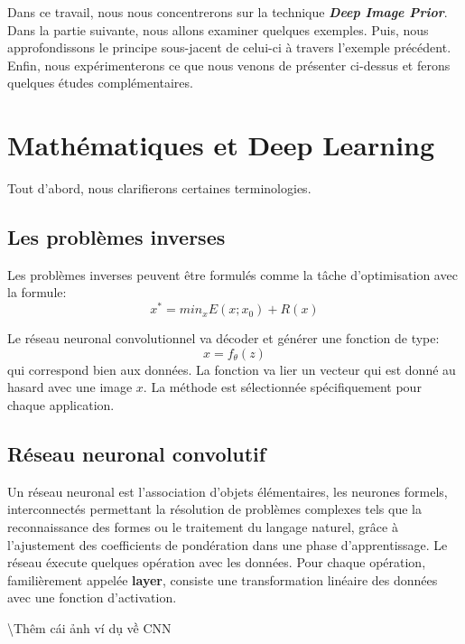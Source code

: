 \documentclass[
  11pt,
  dvipsnames]{article}
\begin{document}
Dans ce travail, nous nous concentrerons sur la technique \textbf{\emph{Deep Image Prior}}.
Dans la partie suivante, nous allons examiner quelques exemples.
Puis, nous approfondissons le principe sous-jacent de celui-ci à travers l'exemple précédent.
Enfin, nous expérimenterons ce que nous venons de présenter ci-dessus
et ferons quelques études complémentaires.

\newpage

\hypertarget{mathuxe9matiques-et-deep-learning}{%
\section{Mathématiques et Deep Learning}\label{mathuxe9matiques-et-deep-learning}}

Tout d'abord, nous clarifierons certaines terminologies.

\hypertarget{les-probluxe8mes-inverses}{%
\subsection{Les problèmes inverses}\label{les-probluxe8mes-inverses}}

Les problèmes inverses peuvent être formulés comme la tâche d'optimisation avec la formule:
\[x^* = min_{x}E(x;x_{0}) + R(x)\]

Le réseau neuronal convolutionnel va décoder et générer une fonction de type:
\[x = f_{\theta}(z)\]
qui correspond bien aux données. La fonction va lier un vecteur qui est donné au hasard avec une image \(x\).
La méthode est sélectionnée spécifiquement pour chaque application.

\hypertarget{ruxe9seau-neuronal-convolutif}{%
\subsection{Réseau neuronal convolutif}\label{ruxe9seau-neuronal-convolutif}}

Un réseau neuronal est l'association d'objets élémentaires, les neurones formels, interconnectés permettant la résolution de problèmes complexes tels que la reconnaissance des formes ou le traitement du langage naturel,
grâce à l'ajustement des coefficients de pondération dans une phase d'apprentissage. Le réseau éxecute quelques opération avec les données. Pour chaque opération, familièrement appelée \textbf{layer}, consiste une transformation linéaire des données avec une fonction d'activation.

\textbackslash Thêm cái ảnh ví dụ về CNN
\end{document}

